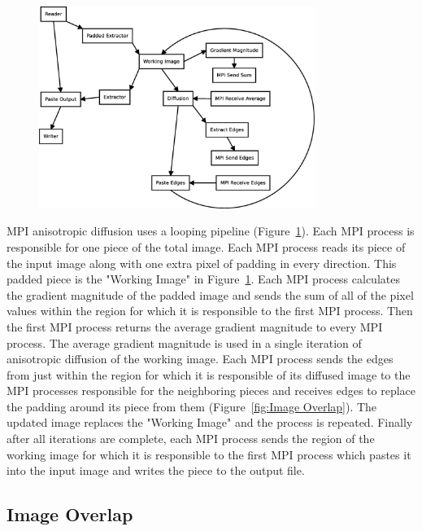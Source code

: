 \documentclass{InsightArticle}
\begin{document}
\begin{figure}
\center
\includegraphics[width=0.8\textwidth]{MPIVectorGradientAnisotropicDiffusionGraph.eps}
\label{fig:Image Pipline}
\end{figure}

MPI anisotropic diffusion uses a looping pipeline 
(Figure~\ref{fig:Image Pipline}). Each MPI process is 
responsible for one piece of the total image. Each MPI 
process reads its piece of the input image along with one 
extra pixel of padding in every direction. This padded 
piece is the "Working Image" in 
Figure~\ref{fig:Image Pipline}. Each MPI process 
calculates the gradient magnitude of the padded image and 
sends the sum of all of the pixel values within the region 
for which it is responsible to the first MPI process. Then 
the first MPI process returns the average gradient 
magnitude to every MPI process. The average gradient 
magnitude is used in a single iteration of anisotropic 
diffusion of the working image. Each MPI process sends the 
edges from just within the region for which it is 
responsible of its diffused image to the MPI 
processes responsible for the neighboring pieces and 
receives edges to replace the padding around its piece 
from them (Figure~\ref{fig:Image Overlap}). The updated 
image replaces the "Working Image" and the process is 
repeated. Finally after all iterations are complete, each 
MPI process sends the region of the working image for 
which it is responsible to the first MPI process which 
pastes it into the input image and writes the piece to the 
output file. 

\subsection{Image Overlap}
\end{document}
